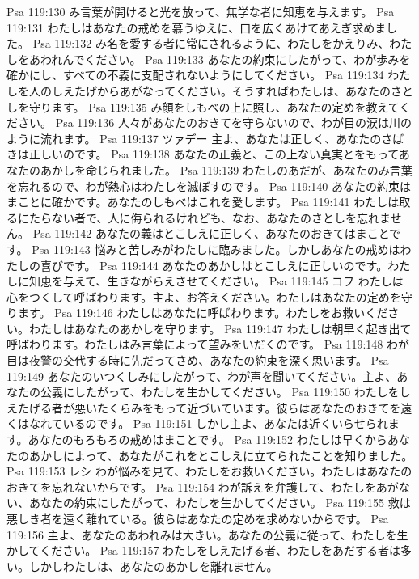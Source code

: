 Psa 119:130  み言葉が開けると光を放って、無学な者に知恵を与えます。
Psa 119:131  わたしはあなたの戒めを慕うゆえに、口を広くあけてあえぎ求めました。
Psa 119:132  み名を愛する者に常にされるように、わたしをかえりみ、わたしをあわれんでください。
Psa 119:133  あなたの約束にしたがって、わが歩みを確かにし、すべての不義に支配されないようにしてください。
Psa 119:134  わたしを人のしえたげからあがなってください。そうすればわたしは、あなたのさとしを守ります。
Psa 119:135  み顔をしもべの上に照し、あなたの定めを教えてください。
Psa 119:136  人々があなたのおきてを守らないので、わが目の涙は川のように流れます。
Psa 119:137  ツァデー 主よ、あなたは正しく、あなたのさばきは正しいのです。
Psa 119:138  あなたの正義と、この上ない真実とをもってあなたのあかしを命じられました。
Psa 119:139  わたしのあだが、あなたのみ言葉を忘れるので、わが熱心はわたしを滅ぼすのです。
Psa 119:140  あなたの約束はまことに確かです。あなたのしもべはこれを愛します。
Psa 119:141  わたしは取るにたらない者で、人に侮られるけれども、なお、あなたのさとしを忘れません。
Psa 119:142  あなたの義はとこしえに正しく、あなたのおきてはまことです。
Psa 119:143  悩みと苦しみがわたしに臨みました。しかしあなたの戒めはわたしの喜びです。
Psa 119:144  あなたのあかしはとこしえに正しいのです。わたしに知恵を与えて、生きながらえさせてください。
Psa 119:145  コフ わたしは心をつくして呼ばわります。主よ、お答えください。わたしはあなたの定めを守ります。
Psa 119:146  わたしはあなたに呼ばわります。わたしをお救いください。わたしはあなたのあかしを守ります。
Psa 119:147  わたしは朝早く起き出て呼ばわります。わたしはみ言葉によって望みをいだくのです。
Psa 119:148  わが目は夜警の交代する時に先だってさめ、あなたの約束を深く思います。
Psa 119:149  あなたのいつくしみにしたがって、わが声を聞いてください。主よ、あなたの公義にしたがって、わたしを生かしてください。
Psa 119:150  わたしをしえたげる者が悪いたくらみをもって近づいています。彼らはあなたのおきてを遠くはなれているのです。
Psa 119:151  しかし主よ、あなたは近くいらせられます。あなたのもろもろの戒めはまことです。
Psa 119:152  わたしは早くからあなたのあかしによって、あなたがこれをとこしえに立てられたことを知りました。
Psa 119:153  レシ わが悩みを見て、わたしをお救いください。わたしはあなたのおきてを忘れないからです。
Psa 119:154  わが訴えを弁護して、わたしをあがない、あなたの約束にしたがって、わたしを生かしてください。
Psa 119:155  救は悪しき者を遠く離れている。彼らはあなたの定めを求めないからです。
Psa 119:156  主よ、あなたのあわれみは大きい。あなたの公義に従って、わたしを生かしてください。
Psa 119:157  わたしをしえたげる者、わたしをあだする者は多い。しかしわたしは、あなたのあかしを離れません。
